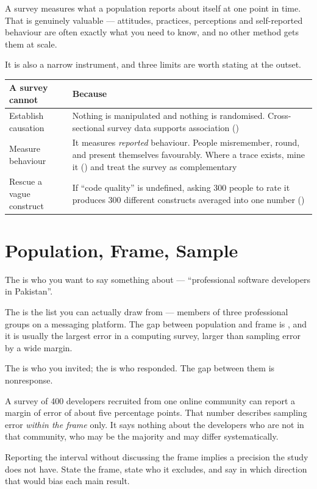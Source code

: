 A survey measures what a population reports about itself at one point in time.
That is genuinely valuable --- attitudes, practices, perceptions and self-reported
behaviour are often exactly what you need to know, and no other method gets
them at scale.

It is also a narrow instrument, and three limits are worth stating at the
outset.

\begin{center}
\small
\begin{tabular}{@{}L{4.4cm}L{9.9cm}@{}}
\toprule
\textbf{A survey cannot} & \textbf{Because} \\
\midrule
Establish causation
  & Nothing is manipulated and nothing is randomised. Cross-sectional survey
    data supports association () \\
Measure behaviour
  & It measures \emph{reported} behaviour. People misremember, round, and
    present themselves favourably. Where a trace exists, mine it
    () and treat the survey as complementary \\
Rescue a vague construct
  & If ``code quality'' is undefined, asking 300 people to rate it produces
    300 different constructs averaged into one number
    () \\
\bottomrule
\end{tabular}
\end{center}

\section{Population, Frame, Sample}

\begin{definitionbox}
The  is who you want to say something about --- ``professional
software developers in Pakistan''.

\medskip
The  is the list you can actually draw from --- members of
three professional groups on a messaging platform. The gap between population
and frame is , and it is usually the largest error in a
computing survey, larger than sampling error by a wide margin.

\medskip
The  is who you invited; the  is who
responded. The gap between them is nonresponse.
\end{definitionbox}

\begin{alertbox}
A survey of 400 developers recruited from one online community can report a
margin of error of about five percentage points. That number describes sampling
error \emph{within the frame} only. It says nothing about the developers who
are not in that community, who may be the majority and may differ
systematically.

\medskip
Reporting the interval without discussing the frame implies a precision the
study does not have. State the frame, state who it excludes, and say in which
direction that would bias each main result.
\end{alertbox}

